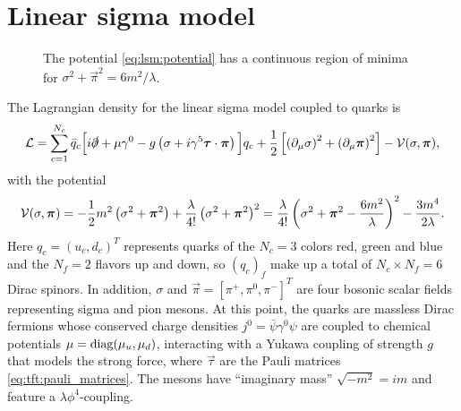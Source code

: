 \chapter{Linear sigma model}

\begin{figure}
\centering
{}
\caption{\label{fig:lsm:potential}%
	The potential \eqref{eq:lsm:potential} has a continuous region of minima for $\sigma^2 + \vec\pi^2 = 6 m^2 / \lambda$.
}
\end{figure}



The Lagrangian density for the linear sigma model coupled to quarks is
\begin{equation}
	\mathcal{L} = \sum_{c=1}^{N_c} \bar{q}_c \Big[ i \slashed\partial + \mu \gamma^0 - g \left( \sigma + i \gamma^5 {\bm{\tau}} \cdot {\bm{\pi}} \right) \Big] q_c
	      + \frac12 \left[ \left( \partial_\mu \sigma \right)^2 + \left( \partial_\mu {\bm{\pi}} \right)^2 \right] - \mathcal{V}(\sigma,{\bm{\pi}}) ,
\label{eq:lsm:lagrangian}
\end{equation}
with the potential
\begin{equation}
	\mathcal{V}(\sigma,{\bm{\pi}}) = -\frac12 m^2 \left( \sigma^2 + {\bm{\pi}}^2 \right) + \frac{\lambda}{4!} \left( \sigma^2 + {\bm{\pi}}^2 \right)^2
	                     = \frac{\lambda}{4!} \left( \sigma^2 + {\bm{\pi}}^2 - \frac{6m^2}{\lambda} \right)^2 -\frac{3 m^4}{2 \lambda} .
\label{eq:lsm:potential}
\end{equation}
Here $q_c = (u_c, d_c)^T$ represents quarks of the $N_c = 3$ colors red, green and blue and the $N_f = 2$ flavors up and down, so $(q_c)_f$ make up a total of $N_c \times N_f = 6$ Dirac spinors.
In addition, $\sigma$ and $\vec\pi = [\pi^+, \pi^0, \pi^-]^T$ are four bosonic scalar fields representing sigma and pion mesons.
At this point, the quarks are massless Dirac fermions whose conserved charge densities $j^0 = \bar\psi \gamma^0 \psi$ are coupled to chemical potentials $\mu = \operatorname{diag}(\mu_u, \mu_d)$, interacting with a Yukawa coupling of strength $g$ that models the strong force, where $\vec\tau$ are the Pauli matrices \eqref{eq:tft:pauli_matrices}.
The mesons have ``imaginary mass'' $\sqrt{-m^2} = i m$ and feature a $\lambda \phi^4$-coupling.

